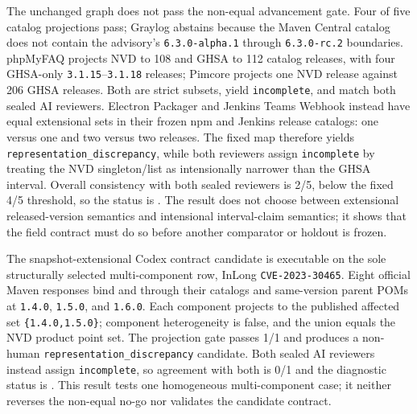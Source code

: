 The unchanged graph does not pass the non-equal advancement gate. Four of five catalog projections pass; Graylog abstains because the Maven Central catalog does not contain the advisory's \texttt{6.3.0-alpha.1} through \texttt{6.3.0-rc.2} boundaries. phpMyFAQ projects NVD to 108 and GHSA to 112 catalog releases, with four GHSA-only \texttt{3.1.15}--\texttt{3.1.18} releases; Pimcore projects one NVD release against 206 GHSA releases. Both are strict subsets, yield \texttt{incomplete}, and match both sealed AI reviewers. Electron Packager and Jenkins Teams Webhook instead have equal extensional sets in their frozen npm and Jenkins release catalogs: one versus one and two versus two releases. The fixed map therefore yields \texttt{representation\_discrepancy}, while both reviewers assign \texttt{incomplete} by treating the NVD singleton/list as intensionally narrower than the GHSA interval. Overall consistency with both sealed reviewers is 2/5, below the fixed 4/5 threshold, so the status is . The result does not choose between extensional released-version semantics and intensional interval-claim semantics; it shows that the field contract must do so before another comparator or holdout is frozen.

The snapshot-extensional Codex contract candidate is executable on the sole structurally selected multi-component row, InLong \texttt{CVE-2023-30465}. Eight official Maven responses bind  and  through their catalogs and same-version  parent POMs at \texttt{1.4.0}, \texttt{1.5.0}, and \texttt{1.6.0}. Each component projects to the published affected set \texttt{\{1.4.0,1.5.0\}}; component heterogeneity is false, and the union equals the NVD product point set. The projection gate passes 1/1 and produces a non-human \texttt{representation\_discrepancy} candidate. Both sealed AI reviewers instead assign \texttt{incomplete}, so agreement with both is 0/1 and the diagnostic status is . This result tests one homogeneous multi-component case; it neither reverses the non-equal no-go nor validates the candidate contract.

